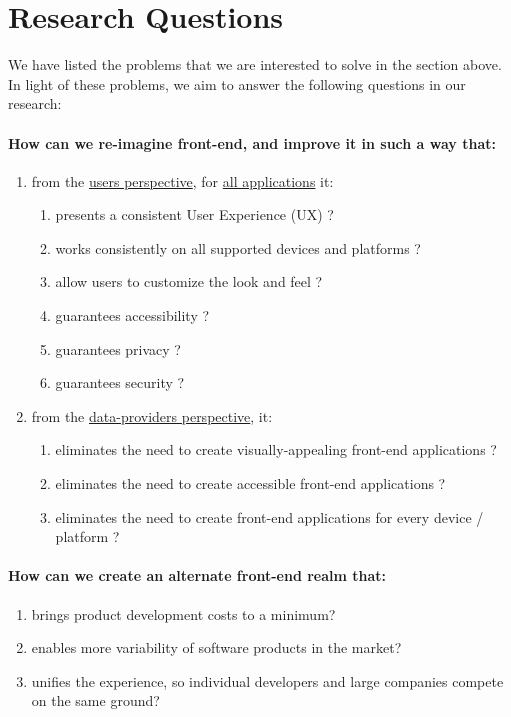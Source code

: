 
\section{Research Questions}

We have listed the problems that we are interested to solve in the section above. In light of these problems, we aim to answer the following questions in our research:

\paragraph{How can we re-imagine front-end, and improve it in such a way that:}
\begin{enumerate}
  \item from the \underline{users perspective}, for \underline{all applications} it:
  \begin{enumerate}
    \item presents a consistent User Experience (UX) ?
    \item works consistently on all supported devices and platforms ?
    \item allow users to customize the look and feel ?
    \item guarantees accessibility ?
    \item guarantees privacy ?
    \item guarantees security ?
  \end{enumerate}
  \item from the \underline{data-providers perspective}, it:
  \begin{enumerate}
    \item eliminates the need to create visually-appealing front-end applications ?
    \item eliminates the need to create accessible front-end applications ?
    \item eliminates the need to create front-end applications for every device / platform ?
  \end{enumerate}
\end{enumerate}

\paragraph{How can we create an alternate front-end realm that:}
\begin{enumerate}
  \item brings product development costs to a minimum?
  \item enables more variability of software products in the market?
  \item unifies the experience, so individual developers and large companies compete on the same ground?
\end{enumerate}